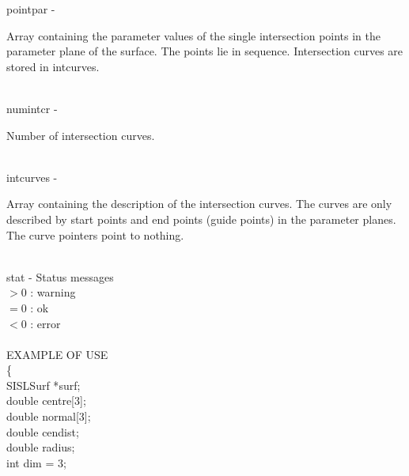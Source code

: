         \>\>    {\fov pointpar}\> - \>  \begin{minipg2}
                                Array containing the parameter values of the single
                                intersection points in the parameter plane of the
                                surface. The points lie in sequence. Intersection curves
                                are stored in intcurves.
                                \end{minipg2}\\[0.8ex]
        \>\>    {\fov numintcr}\> - \>  \begin{minipg2}
                                Number of intersection curves.
                                \end{minipg2}\\
        \>\>    {\fov intcurves}\> - \>\begin{minipg2}
                                Array containing the description of the intersection
                                curves. The curves are only described by
                                start points and end points (guide points) in
                                the parameter planes.
                                The curve pointers point
                                to nothing.
                                \end{minipg2}\\[0.3ex]
        \>\>    {\fov stat}     \> - \> Status messages\\
                \>\>\>\>\>              $> 0$   : warning\\
                \>\>\>\>\>              $= 0$   : ok\\
                \>\>\>\>\>              $< 0$   : error\\
\\
EXAMPLE OF USE\\
                \>      \{ \\
                \>\>    SISLSurf        \>      *{\fov surf};\\
                \>\>    double  \>      {\fov centre}[3];\\
                \>\>    double  \>      {\fov normal}[3];\\
                \>\>    double  \>      {\fov cendist};\\
                \>\>    double  \>      {\fov radius};\\
                \>\>    int     \>      {\fov dim} = 3;\\
